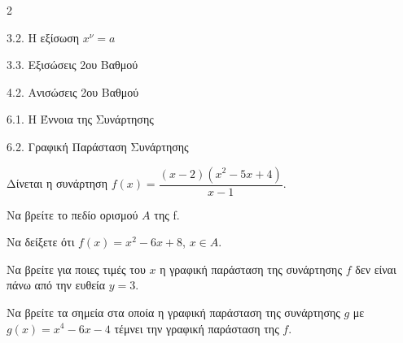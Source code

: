 \begin{ylh}{2}
    \item 3.2. Η εξίσωση $x^{\nu}=a$
    \item 3.3. Εξισώσεις 2ου Βαθμού
    \item 4.2. Ανισώσεις 2ου Βαθμού
    \item 6.1. Η Έννοια της Συνάρτησης
    \item 6.2. Γραφική Παράσταση Συνάρτησης
\end{ylh}
Δίνεται η συνάρτηση $f(x) = \dfrac{(x-2)(x^2-5x+4)}{x-1}$.

\begin{alist}
\item Να βρείτε το πεδίο ορισμού $A$ της f. 
\item Να δείξετε ότι $f(x) = x^2-6x+8$, $x \in A$.
\item Να βρείτε για ποιες τιμές του $x$ η γραφική παράσταση της συνάρτησης $f$ δεν είναι πάνω από την ευθεία $y = 3$.
\item Να βρείτε τα σημεία στα οποία η γραφική παράσταση της συνάρτησης $g$ με $g(x) = x^4 - 6x - 4$ τέμνει την γραφική παράσταση της $f$.

\end{alist}

